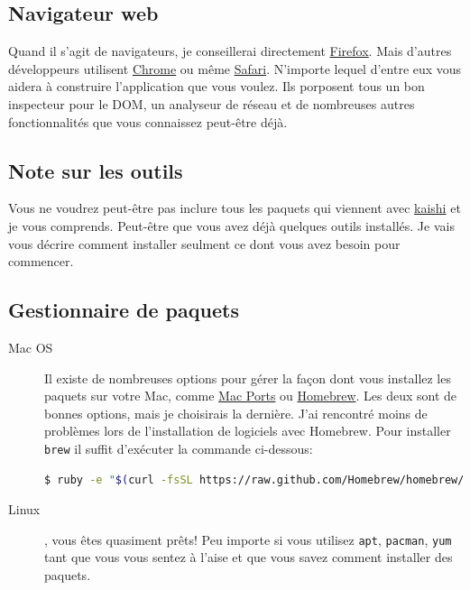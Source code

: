 \documentclass[]{report}
\begin{document}
    \subsection{Navigateur web}

      Quand il s'agit de navigateurs, je conseillerai directement \href{http://www.mozilla.org/en-US/firefox/new/}{Firefox}. Mais d'autres développeurs utilisent \href{https://www.google.com/intl/en/chrome/browser/}{Chrome} ou même \href{https://www.apple.com/safari/}{Safari}. N'importe lequel d'entre eux vous aidera à construire l'application que vous voulez. Ils porposent tous un bon inspecteur pour le DOM, un analyseur de réseau et de nombreuses autres fonctionnalités que vous connaissez peut-être déjà.

    \subsection{Note sur les outils}

      Vous ne voudrez peut-être pas inclure tous les paquets qui viennent avec \href{http://icalialabs.github.io/kaishi/}{kaishi} et je vous comprends. Peut-être que vous avez déjà quelques outils installés. Je vais vous décrire comment installer seulment ce dont vous avez besoin pour commencer.

    \subsection{Gestionnaire de paquets}

      \begin{description}
        \item[Mac OS] Il existe de nombreuses options pour gérer la façon dont vous installez les paquets sur votre Mac, comme \href{https://www.macports.org/}{Mac Ports} ou \href{http://brew.sh/}{Homebrew}. Les deux sont de bonnes options, mais je choisirais la dernière. J'ai rencontré moins de problèmes lors de l'installation de logiciels avec Homebrew. Pour installer \verb|brew| il suffit d'exécuter la commande ci-dessous:
        \begin{scriptsize}
          \begin{lstlisting}[language=bash]
          $ ruby -e "$(curl -fsSL https://raw.github.com/Homebrew/homebrew/go/install)"
          \end{lstlisting}
        \end{scriptsize}
        \item[Linux], vous êtes quasiment prêts! Peu importe si vous utilisez \verb|apt|, \verb|pacman|, \verb|yum| tant que vous vous sentez à l'aise et que vous savez comment installer des paquets.
      \end{description}
\end{document}
